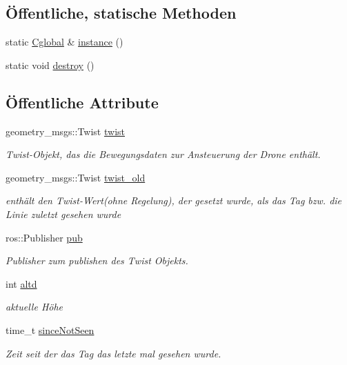 \subsection*{Öffentliche, statische Methoden}
\begin{DoxyCompactItemize}
\item 
static \hyperlink{class_cglobal}{Cglobal} \& \hyperlink{class_cglobal_a0e96a5f7f00ef5a151da708a17340f08}{instance} ()
\item 
static void \hyperlink{class_cglobal_aa1d07161425d12bc42dd100140407e59}{destroy} ()
\end{DoxyCompactItemize}
\subsection*{Öffentliche Attribute}
\begin{DoxyCompactItemize}
\item 
geometry\_\-msgs::Twist \hyperlink{class_cglobal_acdd49b2fad30faf04785664c422f5ef7}{twist}
\begin{DoxyCompactList}\small\item\em Twist-\/Objekt, das die Bewegungsdaten zur Ansteuerung der Drone enthält. \end{DoxyCompactList}\item 
geometry\_\-msgs::Twist \hyperlink{class_cglobal_ae99f21083838b00781e4461e3e7accb9}{twist\_\-old}
\begin{DoxyCompactList}\small\item\em enthält den Twist-\/Wert(ohne Regelung), der gesetzt wurde, als das Tag bzw. die Linie zuletzt gesehen wurde \end{DoxyCompactList}\item 
ros::Publisher \hyperlink{class_cglobal_af3a06302b3bd19de728064359241c1a1}{pub}
\begin{DoxyCompactList}\small\item\em Publisher zum publishen des Twist Objekts. \end{DoxyCompactList}\item 
int \hyperlink{class_cglobal_a0e2d4712edf675715bd4bcc554dbcf42}{altd}
\begin{DoxyCompactList}\small\item\em aktuelle Höhe \end{DoxyCompactList}\item 
time\_\-t \hyperlink{class_cglobal_abb1e0f2a241a8d9131098cf823b45f64}{sinceNotSeen}
\begin{DoxyCompactList}\small\item\em Zeit seit der das Tag das letzte mal gesehen wurde. \end{DoxyCompactList}\item 

\end{DoxyCompactItemize}
